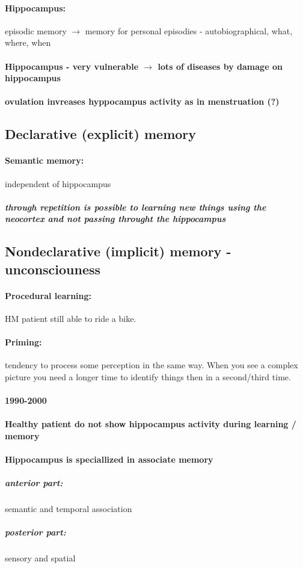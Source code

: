\documentclass[12pt,article,oneside,a4paper]{memoir}
\begin{document}
\paragraph{Hippocampus:} episodic memory $\rightarrow$ memory for personal episodies - autobiographical, what, where, when
\paragraph{Hippocampus - very vulnerable $\rightarrow$ lots of diseases by damage on hippocampus}
\paragraph{ovulation invreases hyppocampus activity as in menstruation (?)}
\subsection{Declarative (explicit) memory }
\paragraph{Semantic memory:} independent of hippocampus
\subparagraph{through repetition is possible to learning new things using the neocortex and not passing throught the hippocampus}
\subsection{Nondeclarative (implicit) memory - unconsciouness}
\paragraph{Procedural learning:} HM patient still able to ride a bike.
\paragraph{Priming:} tendency to process some perception in the same way. When you see a complex picture you need a longer time to identify things then in a second/third time.

\paragraph{1990-2000}
\paragraph{Healthy patient do not show hippocampus activity during learning / memory}
\paragraph{Hippocampus is speciallized in associate memory}
\subparagraph{anterior part:} semantic and temporal association
\subparagraph{posterior part:} sensory and spatial
\end{document}
